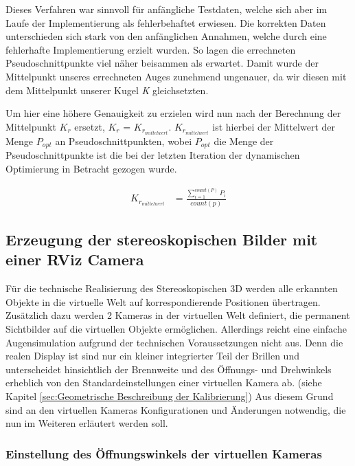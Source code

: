Dieses Verfahren war sinnvoll für anfängliche Testdaten, welche sich aber im Laufe der Implementierung als fehlerbehaftet erwiesen. Die korrekten Daten unterschieden sich stark von den anfänglichen Annahmen, welche durch eine fehlerhafte Implementierung erzielt wurden. So lagen die errechneten Pseudoschnittpunkte viel näher beisammen als erwartet. Damit wurde der Mittelpunkt unseres errechneten Auges zunehmend ungenauer, da wir diesen mit dem Mittelpunkt
unserer Kugel \emph{K} gleichsetzten.

Um hier eine höhere Genauigkeit zu erzielen wird nun nach der Berechnung der Mittelpunkt $K_r$ ersetzt, $K_r$ = $K_{r_{mittelwert}}$. $K_{r_{mittelwert}}$ ist hierbei der Mittelwert der Menge $P_{opt}$ an Pseudoschnittpunkten, wobei $P_{opt}$ die Menge der Pseudoschnittpunkte ist die bei der letzten Iteration der dynamischen Optimierung in Betracht gezogen wurde.


\begin{align}
K_{r_{mittelwert}} &= \frac{\sum\limits_{i=1}^{count(P)} P_i}{count(p)} 
\end{align}

\subsection{Erzeugung der stereoskopischen Bilder mit einer RViz Camera}
Für die technische Realisierung des Stereoskopischen 3D werden alle erkannten Objekte in die virtuelle Welt auf korrespondierende Positionen übertragen. 
Zusätzlich dazu werden 2 Kameras in der virtuellen Welt definiert, die permanent Sichtbilder auf die virtuellen Objekte ermöglichen. Allerdings reicht eine einfache Augensimulation aufgrund der technischen Voraussetzungen nicht aus. 
Denn die realen Display ist sind nur ein kleiner integrierter Teil der Brillen und unterscheidet hinsichtlich der Brennweite und des Öffnungs- und Drehwinkels erheblich von den Standardeinstellungen einer virtuellen Kamera ab. (siehe Kapitel \ref{sec:Geometrische Beschreibung der Kalibrierung})
Aus diesem Grund sind an den virtuellen Kameras Konfigurationen und Änderungen notwendig, die nun im Weiteren erläutert werden soll. 


\subsubsection{Einstellung des Öffnungswinkels der virtuellen Kameras}
\label{sec:virtuelle Kameras}

